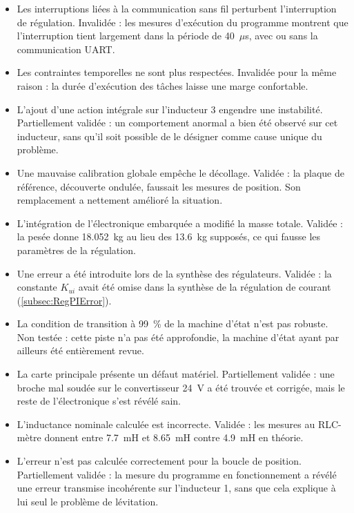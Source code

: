 \begin{itemize}
    \item Les interruptions liées à la communication sans fil perturbent l'interruption de régulation. Invalidée : les mesures d'exécution du programme montrent que l'interruption tient largement dans la période de 40~$\mu$s, avec ou sans la communication UART.

    \item Les contraintes temporelles ne sont plus respectées. Invalidée pour la même raison : la durée d'exécution des tâches laisse une marge confortable.

    \item L'ajout d'une action intégrale sur l'inducteur 3 engendre une instabilité. Partiellement validée : un comportement anormal a bien été observé sur cet inducteur, sans qu'il soit possible de le désigner comme cause unique du problème.

    \item Une mauvaise calibration globale empêche le décollage. Validée : la plaque de référence, découverte ondulée, faussait les mesures de position. Son remplacement a nettement amélioré la situation.

    \item L'intégration de l'électronique embarquée a modifié la masse totale. Validée : la pesée donne 18.052~kg au lieu des 13.6~kg supposés, ce qui fausse les paramètres de la régulation.

    \item Une erreur a été introduite lors de la synthèse des régulateurs. Validée : la constante $K_{ui}$ avait été omise dans la synthèse de la régulation de courant (\autoref{subsec:RegPIError}).

    \item La condition de transition à 99~\% de la machine d'état n'est pas robuste. Non testée : cette piste n'a pas été approfondie, la machine d'état ayant par ailleurs été entièrement revue.

    \item La carte principale présente un défaut matériel. Partiellement validée : une broche mal soudée sur le convertisseur 24~V a été trouvée et corrigée, mais le reste de l'électronique s'est révélé sain.

    \item L'inductance nominale calculée est incorrecte. Validée : les mesures au RLC-mètre donnent entre 7.7~mH et 8.65~mH contre 4.9~mH en théorie.

    \item L'erreur n'est pas calculée correctement pour la boucle de position. Partiellement validée : la mesure du programme en fonctionnement a révélé une erreur transmise incohérente sur l'inducteur 1, sans que cela explique à lui seul le problème de lévitation.
\end{itemize}

